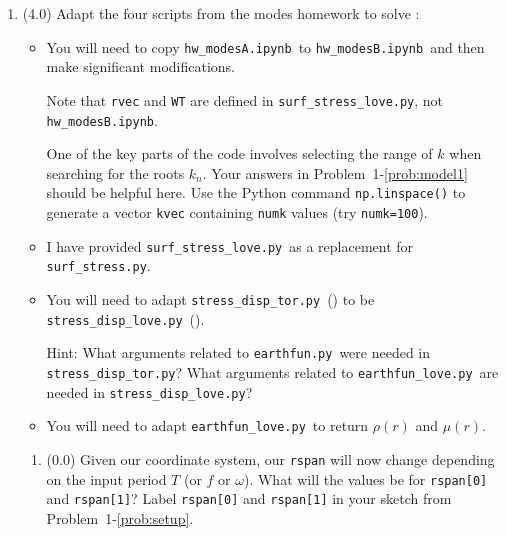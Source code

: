 \documentclass[11pt,titlepage,fleqn]{article}
\newcommand{\tfileA}{{\tt hw\_modesA.ipynb}}
\newcommand{\tfileB}{{\tt surf\_stress.py}}
\newcommand{\tfileC}{{\tt stress\_disp\_tor.py}}
\newcommand{\tfileD}{{\tt earthfun.py}}
\newcommand{\tfileAA}{{\tt hw\_modesB.ipynb}}
\newcommand{\tfileBB}{{\tt surf\_stress\_love.py}}
\newcommand{\tfileCC}{{\tt stress\_disp\_love.py}}
\newcommand{\tfileDD}{{\tt earthfun\_love.py}}
\begin{document}
\begin{enumerate}

\item (4.0) Adapt the four scripts from the modes homework to solve :
%
\begin{itemize}
\item You will need to copy \tfileA\ to \tfileAA\ and then make significant modifications. 

%
%
Note that \verb+rvec+ and \verb+WT+ are defined in \tfileBB, not \tfileAA.

One of the key parts of the code involves selecting the range of $k$ when searching for the roots $k_n$.
Your answers in Problem~1-\ref{prob:model1} should be helpful here.
Use the Python command \verb+np.linspace()+ to generate a vector \verb+kvec+ containing \verb+numk+ values (try \verb+numk=100+).

\item I have provided \tfileBB\ as a replacement for \tfileB.

\item You will need to adapt \tfileC\ () to be \tfileCC\ ().

Hint: What arguments related to \tfileD\ were needed in \tfileC? What arguments related to \tfileDD\ are needed in \tfileCC?

\item You will need to adapt \tfileDD\ to return $\rho(r)$ and $\mu(r)$.


\end{itemize}

\begin{enumerate}
\item (0.0) Given our coordinate system, our \verb+rspan+ will now change depending on the input period $T$ (or $f$ or $\omega$). What will the values be for \verb+rspan[0]+ and \verb+rspan[1]+? Label \verb+rspan[0]+ and \verb+rspan[1]+ in your sketch from Problem~1-\ref{prob:setup}.


\end{enumerate}
\end{enumerate}
\end{document}
